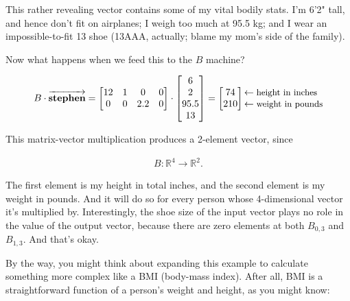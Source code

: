 This rather revealing vector contains some of my vital bodily stats. I'm 6'2"
tall, and hence don't fit on airplanes; I weigh too much at 95.5 kg; and I wear
an impossible-to-fit 13 shoe (13AAA, actually; blame my mom's side of the
family).

Now what happens when we feed this to the $B$ machine?

\vspace{-.15in}
\begin{align*}
B \cdot \overrightarrow{\textbf{stephen}} =
\begin{bmatrix}
12 & 1 & 0 & 0 \\
0 & 0 & 2.2 & 0 \\
\end{bmatrix} \cdot
\begin{bmatrix}
6 \\ 2 \\ 95.5 \\ 13 \\
\end{bmatrix} =
\begin{bmatrix}
74 \\ 210 \\
\end{bmatrix}
\begin{matrix*}[l]
\leftarrow \textrm{\small{height in inches}} \\
\leftarrow \textrm{\small{weight in pounds}} \\
\end{matrix*}
\end{align*}
\vspace{-.15in}

This matrix-vector multiplication produces a 2-element vector, since

\vspace{-.15in}
\begin{align*}
B : \mathbb{R}^4 \rightarrow \mathbb{R}^2.
\end{align*}
\vspace{-.15in}

The first element is my height in total inches, and the second element is my
weight in pounds. And it will do so for every person whose 4-dimensional vector
it's multiplied by. Interestingly, the shoe size of the input vector plays no
role in the value of the output vector, because there are zero elements at both
$B_{0,3}$ and $B_{1,3}$. And that's okay.

\smallskip
{}

By the way, you might think about expanding this example to calculate something
more complex like a BMI (body-mass index). After all, BMI is a straightforward
function of a person's weight and height, as you might know:


